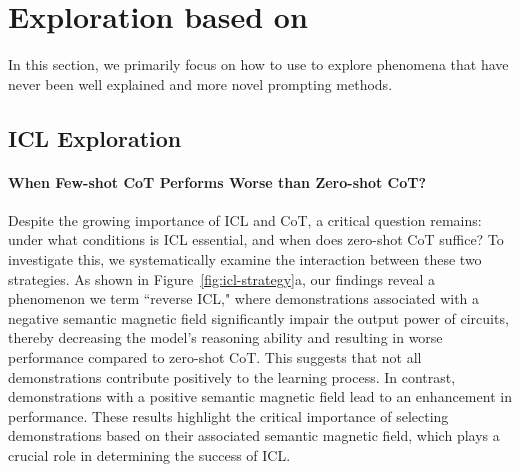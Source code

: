 \section{Exploration based on \modelname{}}
In this section, we primarily focus on how to use \modelname{} to explore phenomena that have never been well explained and more novel prompting methods.
\label{sec:exploration}
\subsection{ICL Exploration}



\paragraph{When Few-shot CoT Performs Worse than Zero-shot CoT?}
Despite the growing importance of ICL and CoT, a critical question remains: under what conditions is ICL essential, and when does zero-shot CoT suffice?
To investigate this, we systematically examine the interaction between these two strategies. As shown in Figure~\ref{fig:icl-strategy}a, our findings reveal a phenomenon we term ``reverse ICL," where demonstrations associated with a negative semantic magnetic field significantly impair the output power of circuits, thereby decreasing the model’s reasoning ability and resulting in worse performance compared to zero-shot CoT. This suggests that not all demonstrations contribute positively to the learning process. In contrast, demonstrations with a positive semantic magnetic field lead to an enhancement in performance. These results highlight the critical importance of selecting demonstrations based on their associated semantic magnetic field, which plays a crucial role in determining the success of ICL.


